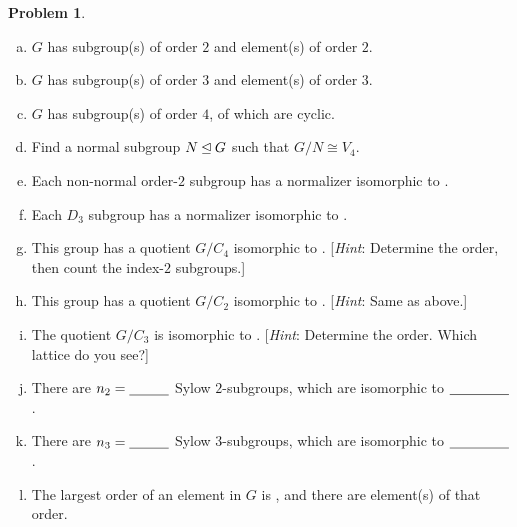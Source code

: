 \documentclass[12pt]{article}
\theoremstyle{definition} %
\newtheorem{problem}{Problem}
\begin{document}
\begin{problem}
\begin{enumerate}[(a)]
  \item $G$ has \uline{\hfill} subgroup(s) of order $2$ and
    \uline{\hfill} element(s) of order $2$. \smallskip
    
  \item $G$ has \uline{\hfill} subgroup(s) of order $3$ and
    \uline{\hfill} element(s) of order $3$. \smallskip

  \item $G$ has \uline{\hfill} subgroup(s) of order $4$, of which
    \uline{\hfill} are cyclic. \smallskip
    
  \item Find a normal subgroup $N\unlhd G$ such that $G/N \cong V_4$.
    
  \item Each non-normal order-$2$ subgroup has a normalizer isomorphic
    to \uline{\hfill}.
    
  \item Each $D_3$ subgroup has a normalizer isomorphic to
    \uline{\hfill}.
    
  \item This group has a quotient $G/C_4$ isomorphic to \uline{\hspace{10mm}}.
    [\emph{Hint}: Determine the order, then count the index-$2$
      subgroups.]

  \item This group has a quotient $G/C_2$ isomorphic to \uline{\hspace{10mm}}.
    [\emph{Hint}: Same as above.]  
    
  \item The quotient $G/C_3$ is isomorphic to \uline{\hspace{10mm}}.
    [\emph{Hint}: Determine the order. Which lattice do you see?]

  \item There are $n_2=\uline{\hspace{10mm}}$ Sylow $2$-subgroups,
    which are isomorphic to $\uline{\hspace{15mm}}$.


  \item There are $n_3=\uline{\hspace{10mm}}$ Sylow $3$-subgroups,
    which are isomorphic to $\uline{\hspace{15mm}}$.

  \item The largest order of an element in $G$ is
    \uline{\hspace{10mm}}, and there are \uline{\hspace{10mm}}
    element(s) of that order.
  \end{enumerate}
\end{problem}
\end{document}
